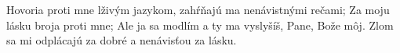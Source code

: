 Hovoria proti mne lživým jazykom,
zahŕňajú ma nenávistnými rečami;
Za moju lásku broja proti mne;
\versseparator
Ale ja sa modlím a ty ma vyslyšíš, Pane, Bože môj.
\versseparator
Zlom sa mi odplácajú za dobré a nenávisťou za lásku. 
